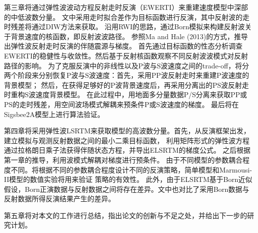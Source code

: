 第三章将通过弹性波波动方程反射走时反演（EWERTI）来重建速度模型中深部的中低波数分量。
文中采用走时拟合差作为目标函数进行反演，其中反射波的走时残差将通过DIW方法来获取。
沿用RWI的思路，通过Born模拟来构建反射波关于背景速度的核函数，即反射波波路径。
参照Ma and Hale (2013)\cite{ma2013}的方式，推导出弹性波反射走时反演的伴随震源与梯度。
首先通过目标函数的性态分析调查EWERTI的稳健性与收敛性。然后基于反射核函数观察不同反射波波模式对反射路径的影响。
为了克服反演中的非线性以及P波与S波速度之间的trade-off，将分两个阶段来分别恢复P波与S波速度：首先，采用PP波反射走时来重建P波速度的背景模型；
然后，在获得足够好的P波背景速度后，再采用分离出的PS波反射走时重构S波速度背景模型。
在此过程中，用地面多分量数据P/S分离来获取PP或PS的走时残差，用空间波场模式解耦来预条件P或S波速度的梯度。
最后将在Sigsbee2A模型上进行算法验证。

第四章将采用弹性波LSRTM来获取模型的高波数分量。首先，从反演框架出发，建立模拟与观测反射数据之间的最小二乘目标函数，
利用矩阵形式的弹性波方程通过拉格朗日乘子法获得伴随状态方程，并导出ELSRTM的梯度公式。
之后根据第一章的推导，利用波模式解耦对梯度进行预条件。
由于不同模型的参数耦合程度不同。将根据不同的参数耦合程度设计不同的反演策略，简单模型和Marmousi-II模型的数值实验将用来验证
策略的有效性。
此外，由于ELSRTM基于Born近似假设，Born正演数据与反射数据之间将存在差异。文中也对比了采用Born数据与反射数据所得反演结果产生的差异。

第五章将对本文的工作进行总结，指出论文的创新与不足之处，并给出下一步的研究计划。
